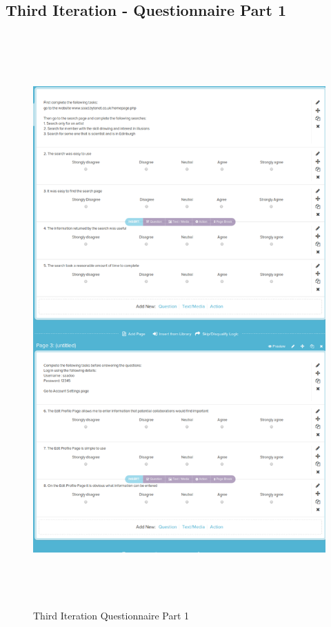 \documentclass[a4paper,oneside,11pt]{report}
\begin{document}
\begin{appendices}
\section{Third Iteration - Questionnaire Part 1}
\begin{figure}[!ht]
\centering
\includegraphics[width=16cm,height=22cm]{appendix/second-iteration-questionnaire-1.png}
\caption{Third Iteration Questionnaire Part 1}
\end{figure}

\pagebreak


\end{appendices}
\end{document}
